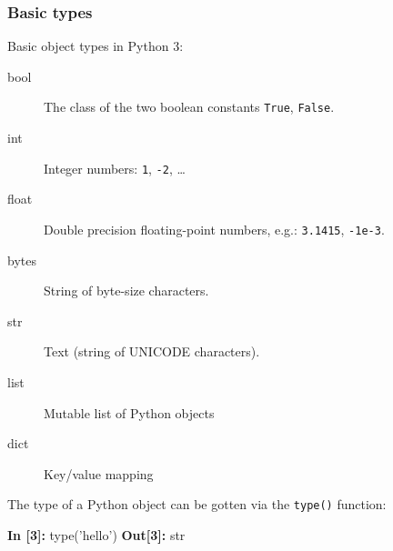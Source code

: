 \documentclass[english,serif,mathserif,xcolor=pdftex,dvipsnames,table]{beamer}
\begin{document}
\begin{frame}[fragile]
  \frametitle{Basic types}
  Basic object types in Python 3:
  \begin{description}
  \item[bool] The class of the two boolean constants \texttt{True}, \texttt{False}.
  \item[int] Integer numbers: \texttt{1}, \texttt{-2}, \ldots
  \item[float] Double precision floating-point numbers, e.g.:
    \texttt{3.1415}, \texttt{-1e-3}.
  \item[bytes] String of byte-size characters.
  \item[str] Text (string of UNICODE characters).
  \item[list] Mutable list of Python objects
  \item[dict] Key/value mapping
  \end{description}

  \+ The type of a Python object can be gotten via the \texttt{type()} function:
\begin{semiverbatim}
{\color{blue}\bfseries In [3]:} type('hello')
{\color{red}\bfseries Out[3]:} str
\end{semiverbatim}
\end{frame}
\end{document}
